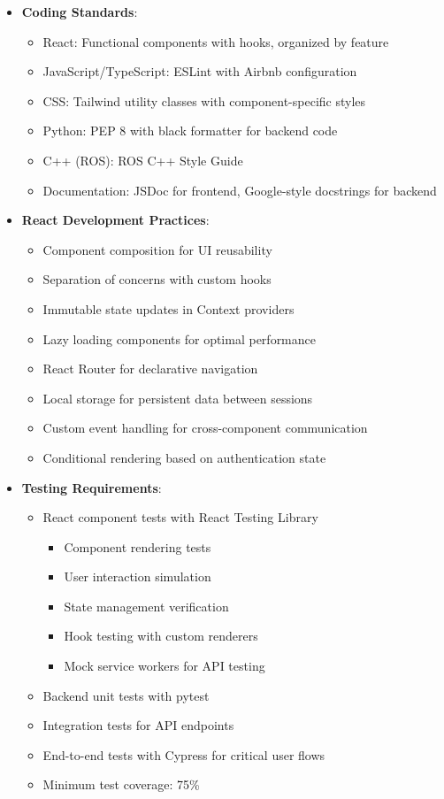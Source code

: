\documentclass[12pt]{article}
\begin{document}
\begin{itemize}
    \item \textbf{Coding Standards}:
    \begin{itemize}
        \item React: Functional components with hooks, organized by feature
        \item JavaScript/TypeScript: ESLint with Airbnb configuration
        \item CSS: Tailwind utility classes with component-specific styles
        \item Python: PEP 8 with black formatter for backend code
        \item C++ (ROS): ROS C++ Style Guide
        \item Documentation: JSDoc for frontend, Google-style docstrings for backend
    \end{itemize}
    
    \item \textbf{React Development Practices}:
    \begin{itemize}
        \item Component composition for UI reusability
        \item Separation of concerns with custom hooks
        \item Immutable state updates in Context providers
        \item Lazy loading components for optimal performance
        \item React Router for declarative navigation
        \item Local storage for persistent data between sessions
        \item Custom event handling for cross-component communication
        \item Conditional rendering based on authentication state
    \end{itemize}
    
    \item \textbf{Testing Requirements}:
    \begin{itemize}
        \item React component tests with React Testing Library
          \begin{itemize}
              \item Component rendering tests
              \item User interaction simulation
              \item State management verification
              \item Hook testing with custom renderers
              \item Mock service workers for API testing
          \end{itemize}
        \item Backend unit tests with pytest
        \item Integration tests for API endpoints
        \item End-to-end tests with Cypress for critical user flows
        \item Minimum test coverage: 75\%
    \end{itemize}
    

\end{itemize}
\end{document}
